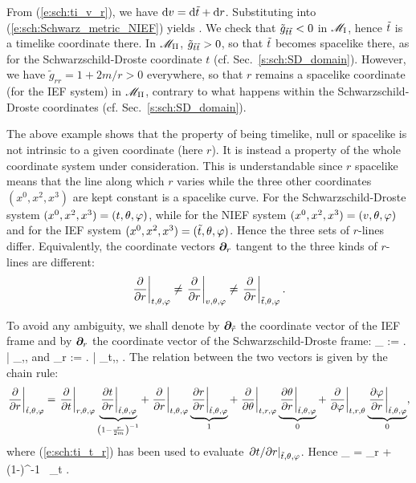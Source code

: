 From (\ref{e:sch:ti_v_r}), we have $\mathrm{d} v = \mathrm{d}{\tilde t} + \mathrm{d} r$. Substituting
into (\ref{e:sch:Schwarz_metric_NIEF}) yields
\be \label{e:sch:Schwarz_metric_EF}
    .
\ee
We check that $\tilde{g}_{{\tilde t}{\tilde t}} < 0$ in $\mathscr{M}_{\rm I}$, hence ${\tilde t}$ is
a timelike coordinate there.
In $\mathscr{M}_{\rm II}$, $\tilde{g}_{{\tilde t}{\tilde t}} > 0$, so that ${\tilde t}$ becomes spacelike
there, as for the Schwarzschild-Droste coordinate $t$ (cf. Sec.~\ref{s:sch:SD_domain}).
However, we have $\tilde{g}_{rr} = 1+2m/r > 0$ everywhere, so that $r$ remains a spacelike coordinate (for the IEF system) in
$\mathscr{M}_{\rm II}$, contrary to what happens within the Schwarzschild-Droste coordinates
(cf. Sec.~\ref{s:sch:SD_domain}).

\begin{remark}
The above example shows that the property of being timelike, null or spacelike
is not intrinsic to a given coordinate (here $r$). It is instead a property
of the whole coordinate system under consideration. This is understandable
since $r$ spacelike means that the line along which $r$ varies while the
three other coordinates $(x^0,x^2,x^3)$ are kept constant is a spacelike curve.
For the Schwarzschild-Droste system $(x^0,x^2,x^3) = (t,\theta,\varphi)$,
while for the NIEF system
$(x^0,x^2,x^3) = (v,\theta,\varphi)$ and for
the IEF system $(x^0,x^2,x^3) = ({\tilde t},\theta,\varphi)$.
Hence the three sets of $r$-lines differ.
Equivalently, the coordinate vectors $\bm{\partial}_r$
tangent to the three kinds of $r$-lines are different:
\[
    \left. \frac{\partial }{\partial r} \right| _{t,\theta,\varphi} \not=
    \left. \frac{\partial }{\partial r} \right| _{v,\theta,\varphi} \not=
    \left. \frac{\partial }{\partial r} \right| _{{\tilde t},\theta,\varphi} .
\]
\end{remark}
To avoid any ambiguity, we shall denote by $\bm{\partial}_{\tilde{r}}$ the
coordinate vector of the IEF frame and by
$\bm{\partial}_r$ the coordinate vector of the Schwarzschild-Droste frame:
\be
    \wpar_{} := \left.  \right| _{\ti,\th,\ph}
    \qquad\mbox{and}\qquad
    \wpar_r := \left.  \right| _{t,\th,\ph} .
\ee
The relation between the two vectors is given by the chain rule:
\[
    \left. \frac{\partial }{\partial r} \right| _{{\tilde t},\theta,\varphi}  =
    \left. \frac{\partial }{\partial t} \right| _{r,\theta,\varphi}
    \underbrace{ \left. \frac{\partial t}{\partial r} \right| _{{\tilde t},\theta,\varphi}}_{\left(1-\frac{r}{2m}\right)^{-1}}
  + \left. \frac{\partial }{\partial r} \right| _{t,\theta,\varphi}
   \underbrace{\left. \frac{\partial r}{\partial r} \right| _{{\tilde t},\theta,\varphi}}_{1}
  + \left. \frac{\partial }{\partial \theta} \right| _{t,r,\varphi}
  \underbrace{\left. \frac{\partial \theta}{\partial r} \right| _{{\tilde t},\theta,\varphi}}_{0}
  + \left. \frac{\partial }{\partial \varphi} \right| _{t,r,\theta}
  \underbrace{\left. \frac{\partial \varphi}{\partial r} \right| _{{\tilde t},\theta,\varphi}}_{0} ,
\]
where (\ref{e:sch:ti_t_r}) has been used to evaluate
$\left. {\partial t}/{\partial r} \right| _{{\tilde t},\theta,\varphi}$. Hence
\be \label{e:sch:wpar_tilde_r}
    \wpar_{} = \wpar_r + \left(1-\right)^{-1} \, \wpar_t .
\ee

